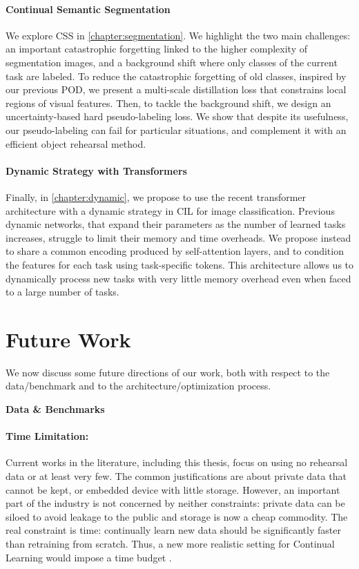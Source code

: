 \paragraph{Continual Semantic Segmentation} We explore \ac{CSS} in \autoref{chapter:segmentation}.
We highlight the two main challenges: an important catastrophic forgetting linked to the higher
complexity of segmentation images, and a background shift where only classes of the current task are
labeled. To reduce the catastrophic forgetting of old classes, inspired by our previous POD, we
present a multi-scale distillation loss that constrains local regions of visual features. Then, to
tackle the background shift, we design an uncertainty-based hard pseudo-labeling loss. We show that
despite its usefulness, our pseudo-labeling can fail for particular situations, and complement it
with an efficient object rehearsal method.

\paragraph{Dynamic Strategy with Transformers} Finally, in \autoref{chapter:dynamic}, we propose to
use the recent transformer architecture with a dynamic strategy in \acf{CIL} for image
classification. Previous dynamic networks, that expand their parameters as the number of learned
tasks increases, struggle to limit their memory and time overheads. We propose instead to share a
common encoding produced by self-attention layers, and to condition the features for each task using
task-specific tokens. This architecture allows us to dynamically process new tasks with very little
memory overhead even when faced to a large number of tasks.

\section{Future Work}

We now discuss some future directions of our work, both with respect to the data/benchmark and to
the architecture/optimization process.

\large{\textbf{Data \& Benchmarks}}

\paragraph{Time Limitation:} Current works in the literature, including this thesis, focus on using
no rehearsal data or at least very few. The common justifications are about private data that cannot
be kept, or embedded device with little storage. However, an important part of the industry is not
concerned by neither constraints: private data can be siloed to avoid leakage to the public and
storage is now a cheap commodity. The real constraint is time: continually learn new data should be
significantly faster than retraining from scratch. Thus, a new more realistic setting for Continual
Learning would impose a time budget \citep{veniat2018budgetedlearning}.

